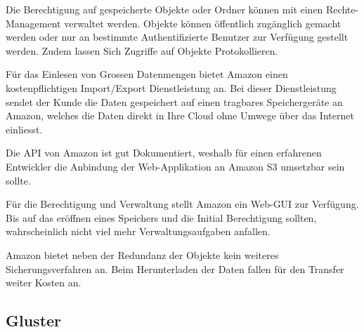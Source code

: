 Die Berechtigung auf gespeicherte Objekte oder Ordner können mit einen Rechte-Management verwaltet werden. Objekte können öffentlich zugänglich gemacht werden oder nur an bestimmte Authentifizierte Benutzer zur Verfügung gestellt werden. Zudem lassen Sich Zugriffe auf Objekte Protokollieren.\cite{Amazon2012b}

Für das Einlesen von Grossen Datenmengen bietet Amazon einen kostenpflichtigen Import/Export Dienstleistung an. Bei dieser Dienstleistung sendet der Kunde die Daten gespeichert auf  einen tragbares Speichergeräte an Amazon, welches die Daten direkt in Ihre Cloud ohne Umwege über das Internet einliesst.

Die API von Amazon ist gut Dokumentiert, weshalb für einen erfahrenen Entwickler die Anbindung der Web-Applikation an Amazon S3 umsetzbar sein sollte.

Für die Berechtigung und Verwaltung stellt Amazon ein Web-GUI zur Verfügung. Bis auf das eröffnen eines Speichers und die Initial Berechtigung sollten, wahrscheinlich nicht viel mehr Verwaltungsaufgaben anfallen.

Amazon bietet neben der Redundanz der Objekte kein weiteres Sicherungsverfahren an. Beim Herunterladen der Daten fallen für den Transfer weiter Kosten an.

\subsection{Gluster}

